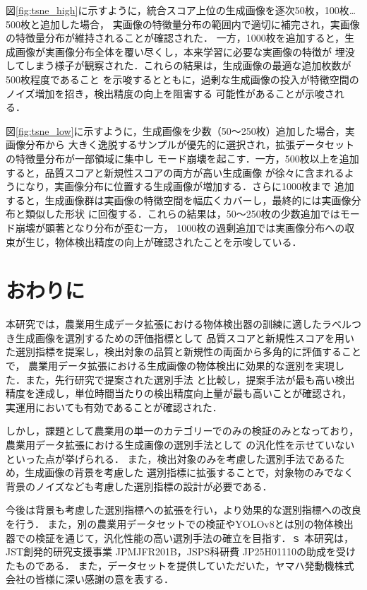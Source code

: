 \documentclass[Japanese]{dicomopapers}
\begin{document}
  図\ref{fig:tsne_high}に示すように，統合スコア上位の生成画像を逐次50枚，100枚…500枚と追加した場合，
  実画像の特徴量分布の範囲内で適切に補完され，実画像の特徴量分布が維持されることが確認された．
  一方，1000枚を追加すると，生成画像が実画像分布全体を覆い尽くし，本来学習に必要な実画像の特徴が
  埋没してしまう様子が観察された．これらの結果は，生成画像の最適な追加枚数が500枚程度であること
  を示唆するとともに，過剰な生成画像の投入が特徴空間のノイズ増加を招き，検出精度の向上を阻害する
  可能性があることが示唆される．

  図\ref{fig:tsne_low}に示すように，生成画像を少数（50～250枚）追加した場合，実画像分布から
  大きく逸脱するサンプルが優先的に選択され，拡張データセットの特徴量分布が一部領域に集中し
  モード崩壊を起こす．一方，500枚以上を追加すると，品質スコアと新規性スコアの両方が高い生成画像
  が徐々に含まれるようになり，実画像分布に位置する生成画像が増加する．さらに1000枚まで
  追加すると，生成画像群は実画像の特徴空間を幅広くカバーし，最終的には実画像分布と類似した形状
  に回復する．これらの結果は，50～250枚の少数追加ではモード崩壊が顕著となり分布が歪む一方，
  1000枚の過剰追加では実画像分布への収束が生じ，物体検出精度の向上が確認されたことを示唆している．
\section{おわりに}

本研究では，農業用生成データ拡張における物体検出器の訓練に適したラベルつき生成画像を選別するための評価指標として
品質スコアと新規性スコアを用いた選別指標を提案し，検出対象の品質と新規性の両面から多角的に評価することで，
農業用データ拡張における生成画像の物体検出に効果的な選別を実現した．また，先行研究で提案された選別手法
と比較し，提案手法が最も高い検出精度を達成し，単位時間当たりの検出精度向上量が最も高いことが確認され，
実運用においても有効であることが確認された．

しかし，課題として農業用の単一のカテゴリーでのみの検証のみとなっており，農業用データ拡張における生成画像の選別手法として
の汎化性を示せていないといった点が挙げられる．
また，検出対象のみを考慮した選別手法であるため，生成画像の背景を考慮した
選別指標に拡張することで，対象物のみでなく背景のノイズなども考慮した選別指標の設計が必要である．

今後は背景も考慮した選別指標への拡張を行い，より効果的な選別指標への改良を行う．
また，別の農業用データセットでの検証やYOLOv8とは別の物体検出器での検証を通じて，汎化性能の高い選別手法の確立を目指す．ｓ
\vspace{8pt}
\acknowledgment 
本研究は，JST創発的研究支援事業 JPMJFR201B，JSPS科研費 JP25H01110の助成を受けたものである．
また，データセットを提供していただいた，ヤマハ発動機株式会社の皆様に深い感謝の意を表する．
\end{document}
